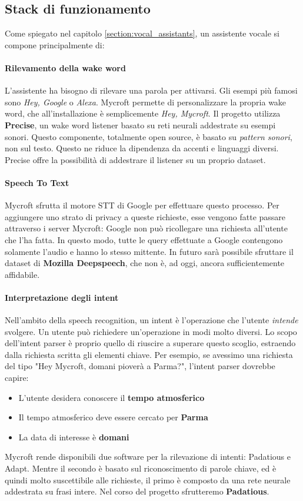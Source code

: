 \subsection{Stack di funzionamento}
Come spiegato nel capitolo \ref{section:vocal_assistants}, un assistente vocale si compone principalmente di:
\paragraph{Rilevamento della wake word} L'assistente ha bisogno di rilevare una parola per attivarsi. Gli esempi più famosi sono \textit{Hey, Google} o \textit{Alexa}. Mycroft permette di personalizzare la propria wake word, che all'installazione è semplicemente \textit{Hey, Mycroft}. Il progetto utilizza \textbf{Precise}, un wake word listener basato su reti neurali addestrate su esempi sonori. Questo componente, totalmente open source, è basato su \textit{pattern sonori}, non sul testo. Questo ne riduce la dipendenza da accenti e linguaggi diversi. Precise offre la possibilità di addestrare il listener su un proprio dataset.
\paragraph{Speech To Text} Mycroft sfrutta il motore STT di Google per effettuare questo processo. Per aggiungere uno strato di privacy a queste richieste, esse vengono fatte passare attraverso i server Mycroft: Google non può ricollegare una richiesta all'utente che l'ha fatta. In questo modo, tutte le query effettuate a Google contengono solamente l'audio e hanno lo stesso mittente. In futuro sarà possibile sfruttare il dataset di \textbf{Mozilla Deepspeech}, che non è, ad oggi, ancora sufficientemente affidabile.
\paragraph{Interpretazione degli intent} Nell'ambito della speech recognition, un intent è l'operazione che l'utente \textit{intende} svolgere. Un utente può richiedere un'operazione in modi molto diversi. Lo scopo dell'intent parser è proprio quello di riuscire a superare questo scoglio, estraendo dalla richiesta scritta gli elementi chiave. Per esempio, se avessimo una richiesta del tipo "Hey Mycroft, domani pioverà a Parma?", l'intent parser dovrebbe capire:
\begin{itemize}
    \item L'utente desidera conoscere il \textbf{tempo atmosferico}
    \item Il tempo atmosferico deve essere cercato per \textbf{Parma}
    \item La data di interesse è \textbf{domani}
\end{itemize}
Mycroft rende disponibili due software per la rilevazione di intenti: Padatious e Adapt. Mentre il secondo è basato sul riconoscimento di parole chiave, ed è quindi molto suscettibile alle richieste, il primo è composto da una rete neurale addestrata su frasi intere. Nel corso del progetto sfrutteremo \textbf{Padatious}.
